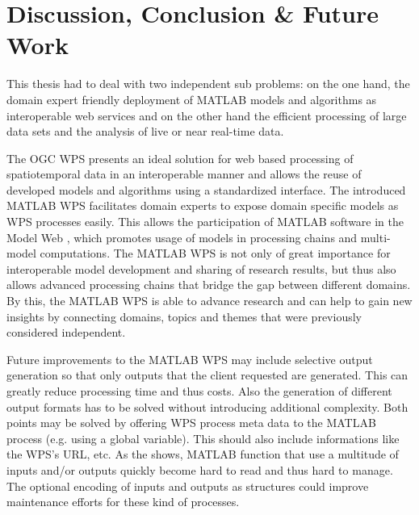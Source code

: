 
\chapter{Discussion, Conclusion \& Future Work}
\label{sec:conclusion}

This thesis had to deal with two independent sub problems: on the one hand, the domain expert friendly deployment of MATLAB models and algorithms as interoperable web services and on the other hand the efficient processing of large data sets and the analysis of live or near real-time data.

The \ac{OGC} \acl{WPS} presents an ideal solution for web based processing of spatiotemporal data in an interoperable manner and allows the reuse of developed models and algorithms using a standardized interface. The introduced MATLAB WPS facilitates domain experts to expose domain specific models as WPS processes easily. This allows the participation of MATLAB software in the Model Web \citep{geller2008looking}, which promotes usage of models in processing chains and multi-model computations. The MATLAB WPS is not only of great importance for interoperable model development and sharing of research results, but thus also allows advanced processing chains that bridge the gap between different domains. By this, the MATLAB WPS is able to advance research and can help to gain new insights by connecting domains, topics and themes that were previously considered independent.

Future improvements to the MATLAB WPS may include selective output generation so that only outputs that the client requested are generated. This can greatly reduce processing time and thus costs. Also the generation of different output formats has to be solved without introducing additional complexity. Both points may be solved by offering WPS process meta data to the MATLAB process (e.g. using a global variable). This should also include informations like the WPS's URL, etc. As the \la shows, MATLAB function that use a multitude of inputs and/or outputs quickly become hard to read and thus hard to manage. The optional encoding of inputs and outputs as structures could improve maintenance efforts for these kind of processes.

